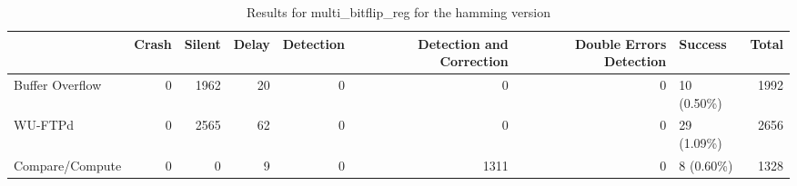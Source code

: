 \begin{table}[t]
	\centering
	\caption{Results for multi_bitflip_reg for the hamming version}
	\label{table:end_sim_by_status_hamming_1_multi_bitflip_reg}
	\begin{tabular}{lrrrrrrlr}
		\toprule
		                & Crash & Silent & Delay & Detection & Detection and Correction & Double Errors Detection & Success     & Total \\
		\midrule
		Buffer Overflow & 0     & 1962   & 20    & 0         & 0                        & 0                       & 10 (0.50\%) & 1992  \\
		WU-FTPd         & 0     & 2565   & 62    & 0         & 0                        & 0                       & 29 (1.09\%) & 2656  \\
		Compare/Compute & 0     & 0      & 9     & 0         & 1311                     & 0                       & 8 (0.60\%)  & 1328  \\
		\bottomrule
	\end{tabular}
\end{table}
